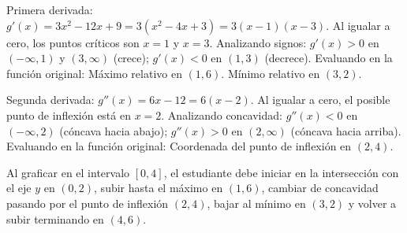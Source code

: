 \documentclass[11pt,paper=a4,answers, addpoints]{exam}
\begin{document}
\begin{questions}
\begin{center}
\end{center}

\begin{solution}
Primera derivada: $g'(x) = 3x^2 - 12x + 9 = 3(x^2 - 4x + 3) = 3(x-1)(x-3)$. 
Al igualar a cero, los puntos críticos son $x=1$ y $x=3$.
Analizando signos: $g'(x) > 0$ en $(-\infty, 1)$ y $(3, \infty)$ (crece); $g'(x) < 0$ en $(1, 3)$ (decrece).
Evaluando en la función original: Máximo relativo en $(1, 6)$. Mínimo relativo en $(3, 2)$.

Segunda derivada: $g''(x) = 6x - 12 = 6(x-2)$. 
Al igualar a cero, el posible punto de inflexión está en $x=2$.
Analizando concavidad: $g''(x) < 0$ en $(-\infty, 2)$ (cóncava hacia abajo); $g''(x) > 0$ en $(2, \infty)$ (cóncava hacia arriba).
Evaluando en la función original: Coordenada del punto de inflexión en $(2, 4)$.

Al graficar en el intervalo $[0,4]$, el estudiante debe iniciar en la intersección con el eje $y$ en $(0,2)$, subir hasta el máximo en $(1,6)$, cambiar de concavidad pasando por el punto de inflexión $(2,4)$, bajar al mínimo en $(3,2)$ y volver a subir terminando en $(4,6)$.
\end{solution}

\end{questions}
\end{document}

